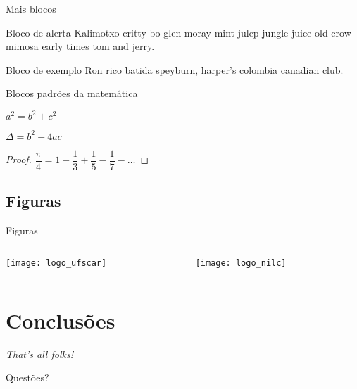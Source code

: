 \documentclass[
	brazilian, %
	12pt, %
]{beamer}
\begin{document}
\begin{frame}{Mais blocos}
	\begin{alertblock}{Bloco de alerta}
		Kalimotxo critty bo glen moray mint julep jungle juice old crow mimosa early times tom and jerry. 
	\end{alertblock}
		
	\begin{exampleblock}{Bloco de exemplo}
		Ron rico batida speyburn, harper's colombia canadian club.
	\end{exampleblock}
\end{frame}

\begin{frame}{Blocos padrões da matemática}
	\begin{theorem}
		$ a^2 = b^2 + c^2 $
	\end{theorem}
	
	\begin{corollary}
		$\Delta = b^2 - 4ac$
	\end{corollary}
	
	\begin{proof}
		$\dfrac{\pi}{4} = 1 - \dfrac{1}{3} + \dfrac{1}{5} - \dfrac{1}{7} -\ldots$
	\end{proof}
\end{frame}

\subsection{Figuras}

\begin{frame}{Figuras}
	\begin{columns}
		\begin{column}{0.5\linewidth}
			\texttt{[image: logo\_ufscar]}
		\end{column}
		\begin{column}{0.5\linewidth}
			\texttt{[image: logo\_nilc]}
		\end{column}
	\end{columns}
\end{frame}

\section{Conclusões}
\begin{frame}
	\centering
	\textit{That's all folks!}
	
	\pause
	\alert{Questões?}
\end{frame}
\end{document}
